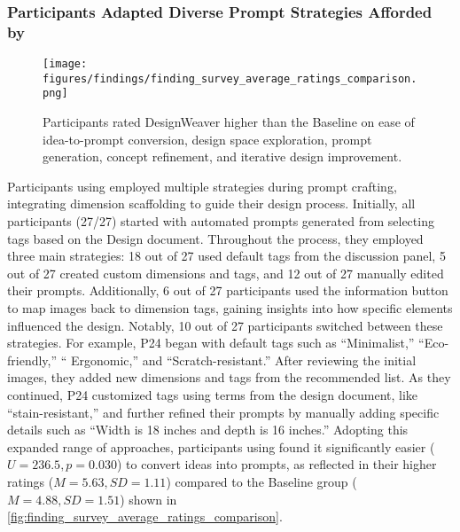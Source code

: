 \subsubsection{Participants Adapted Diverse Prompt Strategies Afforded by \toolname{}}
\label{finding6.1.2:prompt_strategy}

\begin{figure*}[htbp]
    \centering
    \texttt{[image: figures/findings/finding\_survey\_average\_ratings\_comparison.png]}
    \caption{Participants rated DesignWeaver higher than the Baseline on ease of idea-to-prompt conversion, design space exploration, prompt generation, concept refinement, and iterative design improvement.}
    \label{fig:finding_survey_average_ratings_comparison}
\end{figure*}

Participants using \toolname{} employed multiple strategies during prompt crafting, integrating dimension scaffolding to guide their design process. Initially, all participants (27/27) started with automated prompts generated from selecting tags based on the Design document. Throughout the process, they employed three main strategies: 18 out of 27 used default tags from the discussion panel, 5 out of 27 created custom dimensions and tags, and 12 out of 27 manually edited their prompts. Additionally, 6 out of 27 participants used the information button to map images back to dimension tags, gaining insights into how specific elements influenced the design. Notably, 10 out of 27 participants switched between these strategies. For example, P24 began with default tags such as ``Minimalist,'' ``Eco-friendly,'' `` Ergonomic,'' and ``Scratch-resistant.'' After reviewing the initial images, they added new dimensions and tags from the recommended list. As they continued, P24 customized tags using terms from the design document, like ``stain-resistant,'' and further refined their prompts by manually adding specific details such as ``Width is 18 inches and depth is 16 inches.'' Adopting this expanded range of approaches, participants using \toolname{} found it significantly easier ($U = 236.5, p = 0.030$) to convert ideas into prompts, as reflected in their higher ratings ($M = 5.63, SD = 1.11$) compared to the Baseline group ($M = 4.88, SD = 1.51$) shown in \autoref{fig:finding_survey_average_ratings_comparison}. 


